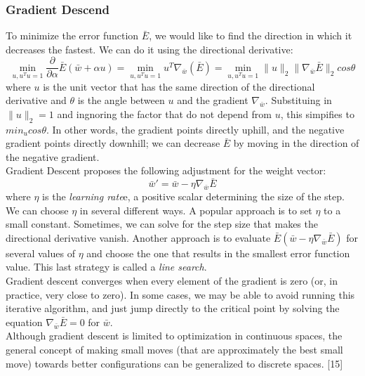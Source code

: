 \subsubsection{Gradient Descend}
To minimize the error function $\bar{E}$, we would like to ﬁnd the direction in which it decreases the fastest. We can do it using the directional derivative: 
$$\min_{u,u^T u=1}\frac{\partial }{\partial {\alpha}}\bar{E}(\bar{w}+\alpha u)=\displaystyle \min_{u,u^T u=1} u^T\nabla_{\bar{w}}(\bar{E})= \min_{u,u^T u=1} \|u\|_2\|\nabla_{\bar{w}}\bar{E}\|_2 cos\theta$$
where $u$ is the unit vector that has the same direction of the directional derivative and $\theta$ is the angle between $u$ and the gradient $\nabla_{\bar{w}}$. Substituing in $\|u\|_2=1$ and ingnoring the factor that do not depend from $u$, this simpifies to $min_u cos \theta$. In other words, the gradient points  directly uphill, and the negative gradient points directly downhill; we can decrease $\bar{E}$ by moving in the direction of the negative gradient. \\
Gradient Descent proposes the following adjustment for the weight vector:
$$\bar{w}'=\bar{w}-\eta \nabla_{\bar{w}}\bar{E}$$
where $\eta$ is the \emph{learning rate}e, a positive scalar determining the size of the step. We can choose $\eta$ in several diﬀerent ways. A popular approach is to set $\eta$ to a small constant. Sometimes, we can solve for the step size that makes the directional derivative vanish. Another approach is to evaluate $\bar{E}(\bar{w}-\eta \nabla_{\bar{w}}\bar{E})$ for several values of $\eta$ and choose the one that results in the smallest error function value. This last strategy is called a \emph{line search}.\\
Gradient descent converges when every element of the gradient is zero (or, in practice, very close to zero). In some cases, we may be able to avoid running this iterative algorithm, and just jump directly to the critical point by solving the equation $\nabla_{\bar{w}}\bar{E}=0$ for $\bar{w}$.\\
Although gradient descent is limited to optimization in continuous spaces, the general concept of making small moves (that are approximately the best small move) towards better conﬁgurations can be generalized to discrete spaces. [15]


